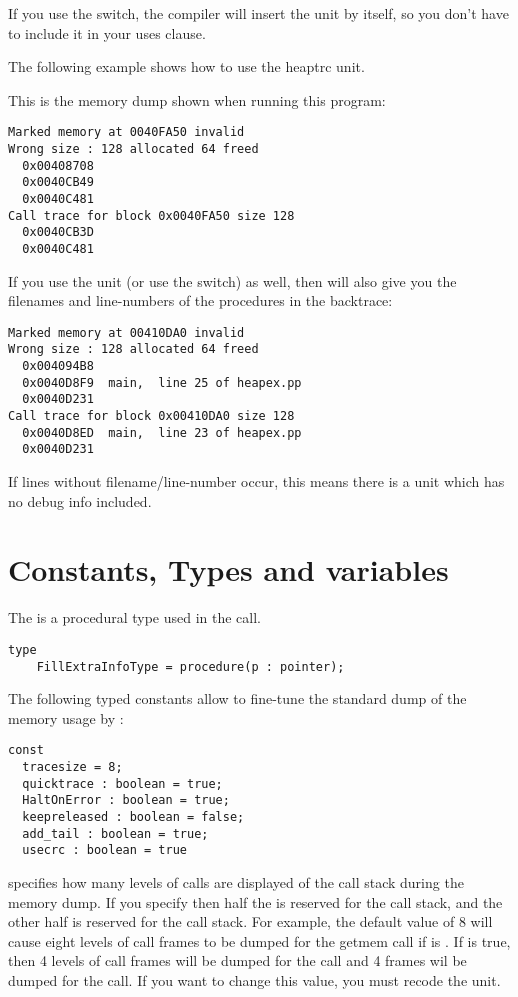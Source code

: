 If you use the  switch, the compiler will insert the unit by itself,
so you don't have to include it in your uses clause.

The following example shows how to use the heaptrc unit.
\latex{}
\html{}

This is the memory dump shown when running this program:
\begin{verbatim}
Marked memory at 0040FA50 invalid
Wrong size : 128 allocated 64 freed
  0x00408708
  0x0040CB49
  0x0040C481
Call trace for block 0x0040FA50 size 128
  0x0040CB3D
  0x0040C481
\end{verbatim}

If you use the  unit (or use the  switch) as well,
then  will also give you the filenames and line-numbers of
the procedures in the backtrace:
\begin{verbatim}
Marked memory at 00410DA0 invalid
Wrong size : 128 allocated 64 freed
  0x004094B8
  0x0040D8F9  main,  line 25 of heapex.pp
  0x0040D231
Call trace for block 0x00410DA0 size 128
  0x0040D8ED  main,  line 23 of heapex.pp
  0x0040D231
\end{verbatim}
If lines without filename/line-number occur, this means there is a unit which
has no debug info included.

\section{Constants, Types and variables}

The  is a procedural type used in the
 call.

\begin{verbatim}
type
    FillExtraInfoType = procedure(p : pointer);
\end{verbatim}
The following typed constants allow to fine-tune the standard dump of the
memory usage by :

\begin{verbatim}
const
  tracesize = 8;
  quicktrace : boolean = true;
  HaltOnError : boolean = true;
  keepreleased : boolean = false;
  add_tail : boolean = true;
  usecrc : boolean = true
\end{verbatim}

 specifies how many levels of calls are displayed of the 
call stack during the memory dump. If you specify 
then half the  is reserved for the  call stack, 
and the other half is reserved for the  call stack.
For example, the default value of 8 will cause eight levels of call frames
to be dumped for the getmem call if  is . If
 is true, then 4 levels of call frames will be dumped for
the  call and 4 frames wil be dumped for the  call.
If you want to change this value, you must recode the  unit.

